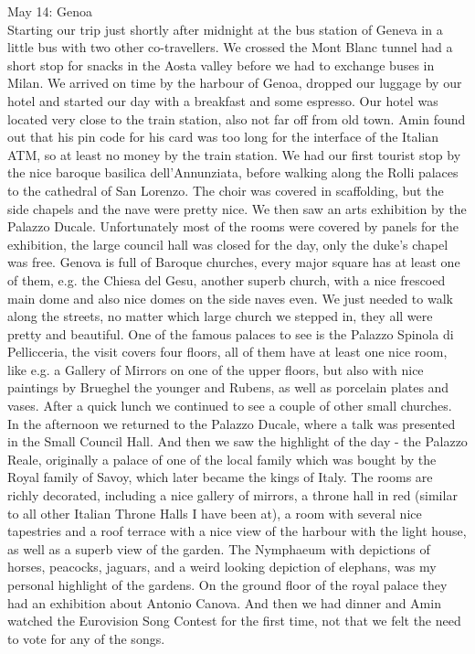 May 14: Genoa\\
Starting our trip just shortly after midnight at the bus station of Geneva in a little bus with two other co-travellers. We crossed the Mont Blanc tunnel had a short stop for snacks in the Aosta valley before we had to exchange buses in Milan. We arrived on time by the harbour of Genoa, dropped our luggage by our hotel and started our day with a breakfast and some espresso. Our hotel was located very close to the train station, also not far off from old town. Amin found out that his pin code for his card was too long for the interface of the Italian ATM, so at least no money by the train station. We had our first tourist stop by the nice baroque basilica dell'Annunziata, before walking along the Rolli palaces to the cathedral of San Lorenzo. The choir was covered in scaffolding, but the side chapels and the nave were pretty nice. We then saw an arts exhibition by the Palazzo Ducale. Unfortunately most of the rooms were covered by panels for the exhibition, the large council hall was closed for the day, only the duke's chapel was free. Genova is full of Baroque churches, every major square has at least one of them, e.g. the Chiesa del Gesu, another superb church, with a nice frescoed main dome and also nice domes on the side naves even. We just needed to walk along the streets, no matter which large church we stepped in, they all were pretty and beautiful. One of the famous palaces to see is the Palazzo Spinola di Pellicceria, the visit covers four floors, all of them have at least one nice room, like e.g. a Gallery of Mirrors on one of the upper floors, but also with nice paintings by Brueghel the younger and Rubens, as well as porcelain plates and vases. After a quick lunch we continued to see a couple of other small churches. In the afternoon we returned to the Palazzo Ducale, where a talk was presented in the Small Council Hall. And then we saw the highlight of the day - the Palazzo Reale, originally a palace of one of the local family which was bought by the Royal family of Savoy, which later became the kings of Italy. The rooms are richly decorated, including a nice gallery of mirrors, a throne hall in red (similar to all other Italian Throne Halls I have been at), a room with several nice tapestries and a roof terrace with a nice view of the harbour with the light house, as well as a superb view of the garden. The Nymphaeum with depictions of horses, peacocks, jaguars, and a weird looking depiction of elephans, was my personal highlight of the gardens. On the ground floor of the royal palace they had an exhibition about Antonio Canova. And then we had dinner and Amin watched the Eurovision Song Contest for the first time, not that we felt the need to vote for any of the songs.\\


